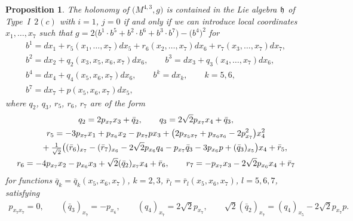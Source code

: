 \documentclass[pdftex]{sigma}
\numberwithin{equation}{section}
\newtheorem{Proposition}[Theorem]{Proposition}
 { \theoremstyle{definition}
\newtheorem{Definition}[Theorem]{Definition}
\newtheorem{Example}[Theorem]{Example}
\newtheorem{Remark}[Theorem]{Remark} }
\newcommand\fh{{\frak h}}
\begin{document}
\begin{Proposition} \label{P2ci} The holonomy of $\big(M^{4,3},g\big)$ is contained in the Lie algebra $\fh$ of Type~I~$2(c)$ with $i=1$, $j=0$ if and only if we can introduce local coordinates $x_1,\dots,x_7$ such that $g=2\big(b^1\cdot b^5+b^2\cdot b^6+b^3\cdot b^7\big)- \big(b^4\big)^2$ for
\begin{gather*}
b^1 = dx_1 + r_5(x_1,\dots, x_7)dx_5+r_6(x_2,\dots,x_7)dx_6+r_7(x_3,\dots,x_7)dx_7, \\
b^2 = dx_2+q_2(x_3,x_5,x_6,x_7)dx_6, \qquad
b^3 = dx_3+q_3(x_4,\dots,x_7) dx_6, \\
b^4 = dx_4+q_4(x_5,x_6,x_7)dx_6, \qquad
b^k = dx_k,\qquad k=5,6, \\
b^7 = dx_7 +p(x_5,x_6,x_7)dx_5,
\end{gather*}
where $q_2$, $q_3$, $r_5$, $r_6$, $r_7$ are of the form
\begin{gather*}
q_2 = 2p_{x_7}x_3+\bar q_2,\qquad
q_3 = 2\sqrt 2 p_{x_7}x_4+\bar q_3,\\
r_5 = -3p_{x_7}x_1+p_{x_6} x_2-p_{x_7}px_3 + \big(2 p_{x_5x_7}+p_{x_6 x_6}-2p_{x_7}^2\big)x_4^2 \\
 \hphantom{r_5 =}{} + \tfrac1{\sqrt2} \big((\bar r_6)_{x_7}-(\bar r_7)_{x_6}-2\sqrt2 p_{x_6}q_4-p_{x_7}\bar q_3 -3p_{x_6}p+(\bar q_3)_{x_5}\big)x_4+\bar r_5,\\
r_6 = -4p_{x_7}x_2- p_{x_6}x_3+\sqrt2 (\bar q_2)_{x_7}x_4+\bar r_6,\qquad
r_7 = -p_{x_7}x_3-2\sqrt2 p_{x_6}x_4+\bar r_7
\end{gather*}
for functions $\bar q_k=\bar q_k(x_5,x_6,x_7)$, $k=2,3$, $\bar r_l=\bar r_l(x_5,x_6,x_7)$, $l=5,6,7$, satisfying
\begin{gather*}p_{x_7 x_7}=0, \qquad (\bar q_3)_{x_7}=-p_{x_6},\qquad (q_4)_{x_7}=2\sqrt2 p_{x_7}, \qquad
\sqrt2 (\bar q_2)_{x_7}=(q_4)_{x_5}-2\sqrt2 p_{x_7}p.
\end{gather*}
\end{Proposition}
\end{document}

